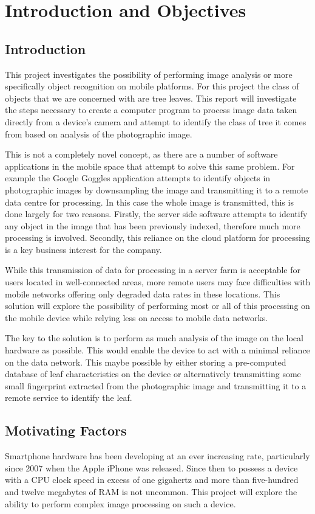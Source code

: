 \chapter{Introduction and Objectives}

\section{Introduction}
This project investigates the possibility of performing image analysis or more specifically object recognition on mobile platforms. For this project the class of objects that we are concerned with are tree leaves. This report will investigate the steps necessary to create a computer program to process image data taken directly from a device's camera and attempt to identify the class of tree it comes from based on analysis of the photographic image.

This is not a completely novel concept, as there are a number of software applications in the mobile space that attempt to solve this same problem. For example the Google Goggles\textsuperscript{\texttrademark} application attempts to identify objects in photographic images by downsampling the image and transmitting it to a remote data centre for processing. In this case the whole image is transmitted, this is done largely for two reasons. Firstly, the server side software attempts to identify any object in the image that has been previously indexed, therefore much more processing is involved. Secondly, this reliance on the cloud platform for processing is a key business interest for the company.

While this transmission of data for processing in a server farm is acceptable for users located in well-connected areas, more remote users may face difficulties with mobile networks offering only degraded data rates in these locations. This solution will explore the possibility of performing most or all of this processing on the mobile device while relying less on access to mobile data networks.

The key to the solution is to perform as much analysis of the image on the local hardware as possible. This would enable the device to act with a minimal reliance on the data network. This maybe possible by either storing a pre-computed database of leaf characteristics on the device or alternatively transmitting some small fingerprint extracted from the photographic image and transmitting it to a remote service to identify the leaf.


\section{Motivating Factors}
Smartphone hardware has been developing at an ever increasing rate, particularly since 2007 when the Apple iPhone was released. Since then to possess a device with a CPU clock speed in excess of one gigahertz and more than five-hundred and twelve megabytes of RAM is not uncommon. This project will explore the ability to perform complex image processing on such a device.

